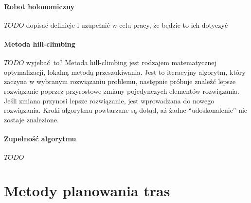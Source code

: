 \subsubsection{Robot holonomiczny}
$TODO$ dopisać definicje i uzupełnić w celu pracy, że będzie to ich dotyczyć

\subsubsection{Metoda hill-climbing}
$TODO$ wyjebać to?
Metoda hill-climbing jest rodzajem matematycznej optymalizacji, lokalną metodą przeszukiwania.
Jest to iteracyjny algorytm, który zaczyna w wybranym rozwiązaniu problemu, następnie próbuje znaleźć lepsze rozwiązanie poprzez przyrostowe zmiany pojedynczych elementów rozwiązania.
Jeśli zmiana przynosi lepsze rozwiązanie, jest wprowadzana do nowego rozwiązania.
Kroki algorytmu powtarzane są dotąd, aż żadne ``udoskonalenie'' nie zostaje znalezione.

\subsubsection{Zupełność algorytmu}
$TODO$

\chapter{Metody planowania tras}
\label{ch:path_planning_methods}

